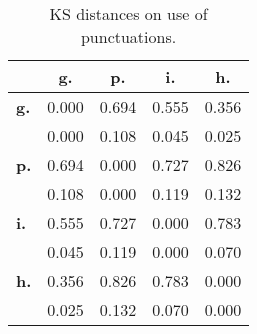 \begin{table}[h!]
\begin{center}
\begin{tabular}{| l || c | c | c | c |}\hline
 & {\bf g.} & {\bf p.} & {\bf i.} & {\bf h.} \\\hline\hline
{\bf g.} & 0.000 & 0.694 & 0.555 & 0.356 \\
{\bf } & 0.000 & 0.108 & 0.045 & 0.025 \\\hline
{\bf p.} & 0.694 & 0.000 & 0.727 & 0.826 \\
{\bf } & 0.108 & 0.000 & 0.119 & 0.132 \\\hline
{\bf i.} & 0.555 & 0.727 & 0.000 & 0.783 \\
{\bf } & 0.045 & 0.119 & 0.000 & 0.070 \\\hline
{\bf h.} & 0.356 & 0.826 & 0.783 & 0.000 \\
{\bf } & 0.025 & 0.132 & 0.070 & 0.000 \\\hline
\end{tabular}
\caption{KS distances on use of punctuations.}
\end{center}
\end{table}